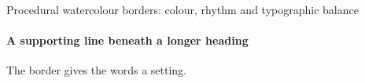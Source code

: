 \documentclass[aspectratio=43]{beamer}
\begin{document}
\begin{frame}{Procedural watercolour borders: colour, rhythm and typographic balance}
  \framesubtitle{A supporting line beneath a longer heading}
  The border gives the words a setting.
\end{frame}
\end{document}
